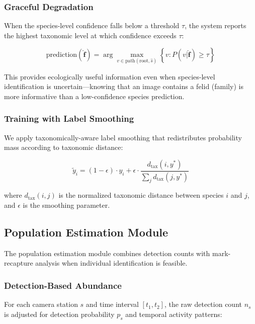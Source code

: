 \documentclass[11pt,letterpaper]{article}
\begin{document}
\subsubsection{Graceful Degradation}

When the species-level confidence falls below a threshold $\tau$, the system reports the highest taxonomic level at which confidence exceeds $\tau$:

\begin{equation}
\text{prediction}(\hat{\mathbf{f}}) = \arg\max_{v \in \text{path}(\text{root}, \hat{s})} \left\{ v : P(v | \hat{\mathbf{f}}) \geq \tau \right\}
\end{equation}

This provides ecologically useful information even when species-level identification is uncertain---knowing that an image contains a felid (family) is more informative than a low-confidence species prediction.

\subsubsection{Training with Label Smoothing}

We apply taxonomically-aware label smoothing that redistributes probability mass according to taxonomic distance:

\begin{equation}
\tilde{y}_i = (1 - \epsilon) \cdot y_i + \epsilon \cdot \frac{d_{\text{tax}}(i, y^*)}{\sum_j d_{\text{tax}}(j, y^*)}
\end{equation}

where $d_{\text{tax}}(i, j)$ is the normalized taxonomic distance between species $i$ and $j$, and $\epsilon$ is the smoothing parameter.

\subsection{Population Estimation Module}

The population estimation module combines detection counts with mark-recapture analysis when individual identification is feasible.

\subsubsection{Detection-Based Abundance}

For each camera station $s$ and time interval $[t_1, t_2]$, the raw detection count $n_s$ is adjusted for detection probability $p_s$ and temporal activity patterns:
\end{document}

